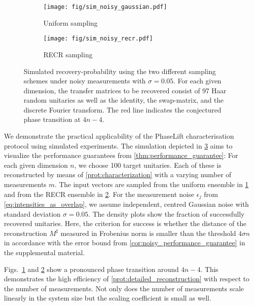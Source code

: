 \begin{figure}[tbp]
  \begin{subfigure}{.475\columnwidth}
    \texttt{[image: fig/sim\_noisy\_gaussian.pdf]}
    \caption{\label{sfig:simplot.gaussian}%
      Uniform sampling
    }
   \end{subfigure}
  \begin{subfigure}{.475\columnwidth}
    \texttt{[image: fig/sim\_noisy\_recr.pdf]}
    \caption{\label{sfig:simplot.recr}%
      RECR sampling
    }
   \end{subfigure}
  \caption{\label{fig:simplot}%
    Simulated recovery-probability using the two different sampling schemes under noisy measurements with $\sigma = 0.05$.
    For each given dimension, the transfer matrices to be recovered consist of 97 Haar random unitaries as well as the identity, the swap-matrix, and the discrete Fourier transform.
    The red line indicates the conjectured phase transition at $4 n - 4$.
  }
\end{figure}

We demonstrate the practical applicability of the PhaseLift characterisation protocol using simulated experiments.
The simulation depicted in \cref{fig:simplot} aims to visualize the performance guarantees from \cref{thm:performance_guarantee}:
For each given dimension $n$, we choose 100 target unitaries.
Each of these is reconstructed by means of \cref{prot:characterization} with a varying number of measurements $m$.
The input vectors are sampled from the uniform ensemble in \cref{sfig:simplot.gaussian} and from the RECR ensemble in \cref{sfig:simplot.recr}.
For the measurement noise $\epsilon_j$ from \cref{eq:intensities_as_overlap}, we assume independent, centred Gaussian noise with standard deviation $\sigma = 0.05$.
The density plots show the fraction of successfully recovered unitaries.
Here, the criterion for success is whether the distance of the reconstruction $M^\sharp$ measured in Frobenius norm is smaller than the threshold  $4 \sigma n$ in accordance with the error bound from \cref{cor:noisy_performance_guarantee} in the supplemental material.

Figs.~\ref{sfig:simplot.gaussian} and \ref{sfig:simplot.recr} show a pronounced phase transition around $4n - 4$.
This demonstrates the high efficiency of \cref{prot:detailed_reconstruction} with respect to the number of measurements.
Not only does the number of measurements scale linearly in the system size but the scaling coefficient is small as well.




